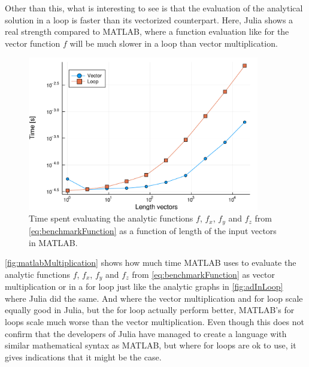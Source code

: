 Other than this, what is interesting to see is that the evaluation of the analytical solution in a loop is faster than its vectorized counterpart. Here, Julia shows a real strength compared to MATLAB, where a function evaluation like for the vector function $f$ will be much slower in a loop than vector multiplication.
\begin{figure}[htb]
    \centering
    \includegraphics[width = 0.9\textwidth]{figures/benchmark_matlab_multiplication.pdf}
    \caption{Time spent evaluating the analytic functions $f$, $f_x$, $f_y$ and $f_z$ from \eqref{eq:benchmarkFunction} as a function of length of the input vectors in MATLAB.}
    \label{fig:matlabMultiplication}
\end{figure}
\autoref{fig:matlabMultiplication} shows how much time MATLAB uses to evaluate the analytic functions $f$, $f_x$, $f_y$ and $f_z$ from \eqref{eq:benchmarkFunction} as vector multiplication or in a for loop just like the analytic graphs in \autoref{fig:adInLoop} where Julia did the same. And where the vector multiplication and for loop scale equally good in Julia, but the for loop actually perform better, MATLAB's for loops scale much worse than the vector multiplication. Even though this does not confirm that the developers of Julia have managed to create a language with similar mathematical syntax as MATLAB, but where for loops are ok to use, it gives indications that it might be the case.

